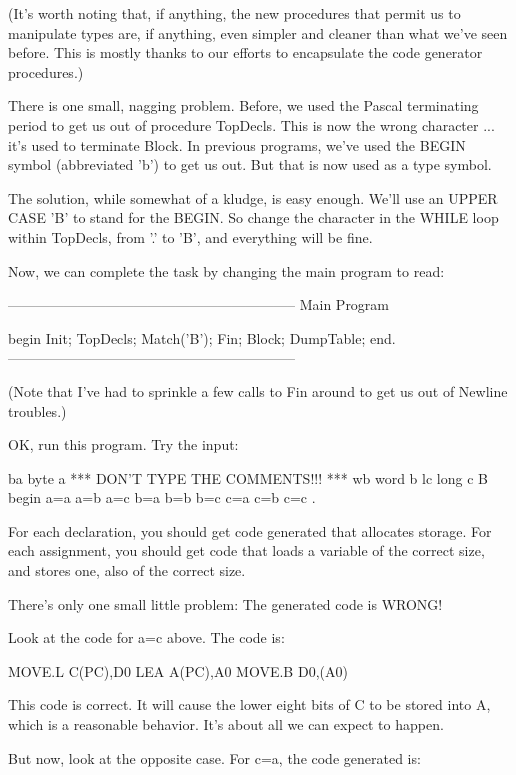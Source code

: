 \documentclass[float=false, crop=false]{standalone}
\begin{document}
(It's worth noting that, if anything, the new procedures that permit us to
manipulate types are, if anything, even simpler and cleaner than what we've seen
before. This is mostly thanks to our efforts to encapsulate the code generator
procedures.)

There is one small, nagging problem. Before, we used the Pascal terminating
period to get us out of procedure TopDecls. This is now the wrong character ...
it's used to terminate Block. In previous programs, we've used the BEGIN symbol
(abbreviated 'b') to get us out. But that is now used as a type symbol.

The solution, while somewhat of a kludge, is easy enough. We'll use an UPPER
CASE 'B' to stand for the BEGIN. So change the character in the WHILE loop
within TopDecls, from '.' to 'B', and everything will be fine.

Now, we can complete the task by changing the main program to read:


{--------------------------------------------------------------}
{ Main Program }

begin
   Init;
   TopDecls;
   Match('B');
   Fin;
   Block;
   DumpTable;
end.
{--------------------------------------------------------------}


(Note that I've had to sprinkle a few calls to Fin around to get us out of
Newline troubles.)

OK, run this program. Try the input:


     ba        { byte a }   *** DON'T TYPE THE COMMENTS!!! ***
     wb        { word b }
     lc        { long c }
     B         { begin  }
     a=a
     a=b
     a=c
     b=a
     b=b
     b=c
     c=a
     c=b
     c=c
     .


For each declaration, you should get code generated that allocates storage. For
each assignment, you should get code that loads a variable of the correct size,
and stores one, also of the correct size.

There's only one small little problem: The generated code is WRONG!

Look at the code for a=c above.  The code is:


     MOVE.L    C(PC),D0
     LEA       A(PC),A0
     MOVE.B    D0,(A0)


This code is correct. It will cause the lower eight bits of C to be stored into
A, which is a reasonable behavior. It's about all we can expect to happen.

But now, look at the opposite case. For c=a, the code generated is:
\end{document}
